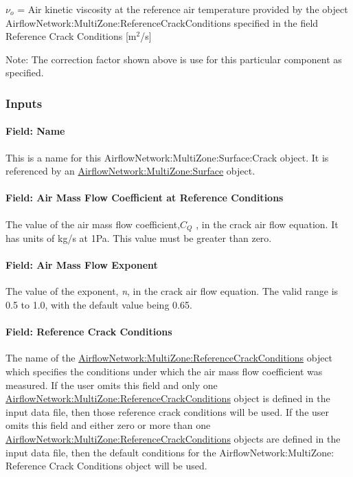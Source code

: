 \(\nu_o\) = Air kinetic viscosity at the reference air temperature provided by the object Air\-flow\-Net\-work:\-Multi\-Zone:\-Refer\-ence\-Crack\-Con\-ditions specified in the field Reference Crack Conditions {[}m\(^{2}\)/s{]}

Note: The correction factor shown above is use for this particular component as specified.

\subsubsection{Inputs}\label{inputs-2-004}

\paragraph{Field: Name}\label{field-name-2-003}

This is a name for this AirflowNetwork:MultiZone:Surface:Crack object. It is referenced by an \hyperref[airflownetworkmultizonesurface]{AirflowNetwork:MultiZone:Surface} object.

\paragraph{Field: Air Mass Flow Coefficient at Reference Conditions}\label{field-air-mass-flow-coefficient-at-reference-conditions}

The value of the air mass flow coefficient,\({C_Q}\) , in the crack air flow equation. It has units of kg/s at 1Pa. This value must be greater than zero.

\paragraph{Field: Air Mass Flow Exponent}\label{field-air-mass-flow-exponent}

The value of the exponent, \emph{n}, in the crack air flow equation. The valid range is 0.5 to 1.0, with the default value being 0.65.

\paragraph{Field: Reference Crack Conditions}\label{field-reference-crack-conditions}

The name of the \hyperref[airflownetworkmultizonereferencecrackconditions]{AirflowNetwork:MultiZone:ReferenceCrackConditions} object which specifies the conditions under which the air mass flow coefficient was measured. If the user omits this field and only one \hyperref[airflownetworkmultizonereferencecrackconditions]{AirflowNetwork:MultiZone:ReferenceCrackConditions} object is defined in the input data file, then those reference crack conditions will be used. If the user omits this field and either zero or more than one \hyperref[airflownetworkmultizonereferencecrackconditions]{AirflowNetwork:MultiZone:ReferenceCrackConditions} objects are defined in the input data file, then the default conditions for the AirflowNetwork:MultiZone: Reference Crack Conditions object will be used.


